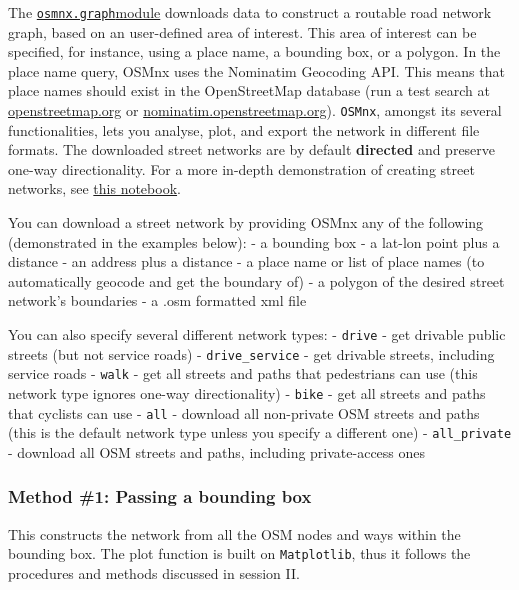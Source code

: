 \documentclass[
  letterpaper,
  DIV=11,
  numbers=noendperiod]{scrreprt}
\begin{document}
The
\href{https://osmnx.readthedocs.io/en/stable/osmnx.html\#module-osmnx.graph}{\texttt{osmnx.graph}module}
downloads data to construct a routable road network graph, based on an
user-defined area of interest. This area of interest can be specified,
for instance, using a place name, a bounding box, or a polygon. In the
place name query, OSMnx uses the Nominatim Geocoding API. This means
that place names should exist in the OpenStreetMap database (run a test
search at \href{https://www.openstreetmap.org/}{openstreetmap.org} or
\href{https://nominatim.openstreetmap.org/ui/search.html}{nominatim.openstreetmap.org}).
\texttt{OSMnx}, amongst its several functionalities, lets you analyse,
plot, and export the network in different file formats. The downloaded
street networks are by default \textbf{directed} and preserve one-way
directionality. For a more in-depth demonstration of creating street
networks, see \href{03-graph-place-queries.ipynb}{this notebook}.

You can download a street network by providing OSMnx any of the
following (demonstrated in the examples below): - a bounding box - a
lat-lon point plus a distance - an address plus a distance - a place
name or list of place names (to automatically geocode and get the
boundary of) - a polygon of the desired street network's boundaries - a
.osm formatted xml file

You can also specify several different network types: - \texttt{drive} -
get drivable public streets (but not service roads) -
\texttt{drive\_service} - get drivable streets, including service roads
- \texttt{walk} - get all streets and paths that pedestrians can use
(this network type ignores one-way directionality) - \texttt{bike} - get
all streets and paths that cyclists can use - \texttt{all} - download
all non-private OSM streets and paths (this is the default network type
unless you specify a different one) - \texttt{all\_private} - download
all OSM streets and paths, including private-access ones

\hypertarget{method-1-passing-a-bounding-box}{%
\subsubsection{Method \#1: Passing a bounding
box}\label{method-1-passing-a-bounding-box}}

This constructs the network from all the OSM nodes and ways within the
bounding box. The plot function is built on \texttt{Matplotlib}, thus it
follows the procedures and methods discussed in session II.
\end{document}
